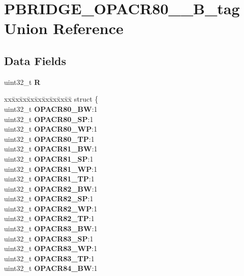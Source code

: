 \hypertarget{unionPBRIDGE__OPACR80__87__32B__tag}{}\section{P\+B\+R\+I\+D\+G\+E\+\_\+\+O\+P\+A\+C\+R80\+\_\+\_\+B\+\_\+tag Union Reference}
\label{unionPBRIDGE__OPACR80__87__32B__tag}
\subsection*{Data Fields}
\begin{DoxyCompactItemize}
\item 
\mbox{\label{unionPBRIDGE__OPACR80__87__32B__tag_a9cbbe5cc7102582d2b96eb745e7407dd}} 
uint32\+\_\+t {\bfseries R}
\item 
\mbox{\label{unionPBRIDGE__OPACR80__87__32B__tag_ab5ff30b15e4064e1692c3ffaa6a4340c}} 
\begin{tabbing}
xx\=xx\=xx\=xx\=xx\=xx\=xx\=xx\=xx\=\kill
struct \{\\
\>uint32\_t {\bfseries OPACR80\_BW}:1\\
\>uint32\_t {\bfseries OPACR80\_SP}:1\\
\>uint32\_t {\bfseries OPACR80\_WP}:1\\
\>uint32\_t {\bfseries OPACR80\_TP}:1\\
\>uint32\_t {\bfseries OPACR81\_BW}:1\\
\>uint32\_t {\bfseries OPACR81\_SP}:1\\
\>uint32\_t {\bfseries OPACR81\_WP}:1\\
\>uint32\_t {\bfseries OPACR81\_TP}:1\\
\>uint32\_t {\bfseries OPACR82\_BW}:1\\
\>uint32\_t {\bfseries OPACR82\_SP}:1\\
\>uint32\_t {\bfseries OPACR82\_WP}:1\\
\>uint32\_t {\bfseries OPACR82\_TP}:1\\
\>uint32\_t {\bfseries OPACR83\_BW}:1\\
\>uint32\_t {\bfseries OPACR83\_SP}:1\\
\>uint32\_t {\bfseries OPACR83\_WP}:1\\
\>uint32\_t {\bfseries OPACR83\_TP}:1\\
\>uint32\_t {\bfseries OPACR84\_BW}:1\\

\end{tabbing}
\end{DoxyCompactItemize}
